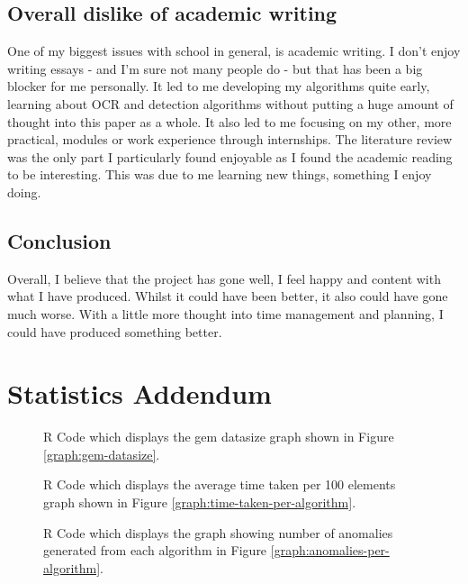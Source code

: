 \documentclass[journal]{IEEEtran}
\begin{document}
\begin{appendices}
\begin{appendices}
        \subsection{Overall dislike of academic writing}
        One of my biggest issues with school in general, is academic writing. I don't enjoy writing essays - and I'm sure not many people do - but that has been a big blocker for me personally. It led to me developing my algorithms quite early, learning about OCR and detection algorithms without putting a huge amount of thought into this paper as a whole. It also led to me focusing on my other, more practical, modules or work experience through internships. The literature review was the only part I particularly found enjoyable as I found the academic reading to be interesting. This was due to me learning new things, something I enjoy doing.

        \subsection{Conclusion}
        Overall, I believe that the project has gone well, I feel happy and content with what I have produced. Whilst it could have been better, it also could have gone much worse. With a little more thought into time management and planning, I could have produced something better. 
    \end{appendices}

    \section{Statistics Addendum}
    \label{appendix:statistics-addendum}

    
    \begin{figure}[hbt!]
        \caption{R Code which displays the gem datasize graph shown in Figure \ref{graph:gem-datasize}.}
        \label{algorithm:r-gem-datasize}
    \end{figure}

    
    \begin{figure}[hbt!]
        \caption{R Code which displays the average time taken per 100 elements graph shown in Figure \ref{graph:time-taken-per-algorithm}.}
        \label{algorithm:r-time-taken-per-element}
    \end{figure}

    
    \begin{figure}[hbt!]
        \caption{R Code which displays the graph showing number of anomalies generated from each algorithm in Figure \ref{graph:anomalies-per-algorithm}.}
        \label{algorithm:r-anomalies-per-algorithm}
    \end{figure}


\end{appendices}
\end{document}
